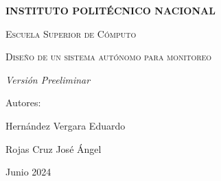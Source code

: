 \begin{titlepage}
\begin{figure}[ht!]
\begin{minipage}{0.2\textwidth}
        \end{minipage}
    \end{figure}
    \centering
    \vspace{1cm}
    {\bfseries\LARGE INSTITUTO POLIT\'ECNICO NACIONAL \par}
    \vspace{1cm}
    {\scshape\Large Escuela Superior de C\'omputo \par}
    \vspace{3cm}
    {\scshape\Huge Dise\~no de un sistema aut\'onomo para monitoreo \par}
    \vspace{3cm}
    {\itshape\Large Versi\'on Preeliminar \par}
    \vfill
    {\Large Autores: \par}
    {\Large Hern\'andez Vergara Eduardo \par}
    {\Large Rojas Cruz Jos\'e \'Angel \par}
    \vfill
    {\Large Junio 2024 \par}
\end{titlepage}